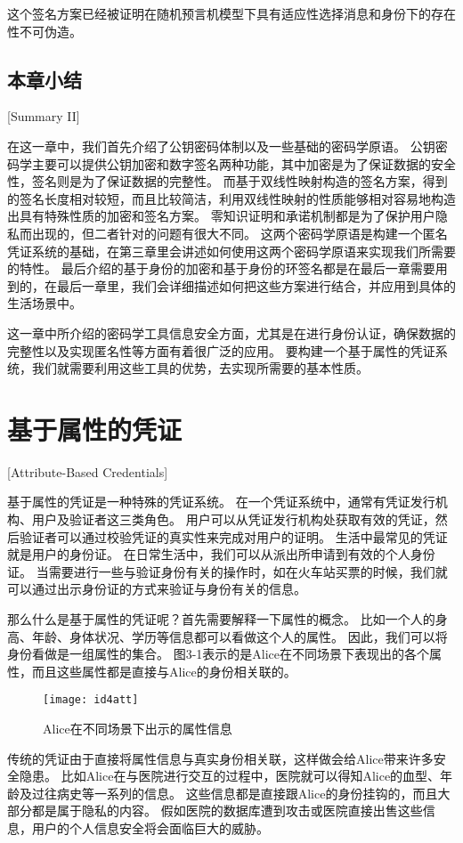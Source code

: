 这个签名方案已经被证明在随机预言机模型下具有适应性选择消息和身份下的存在性不可伪造\cite{chow2005efficient}。

\section{本章小结}[Summary II]

在这一章中，我们首先介绍了公钥密码体制以及一些基础的密码学原语。
公钥密码学主要可以提供公钥加密和数字签名两种功能，其中加密是为了保证数据的安全性，签名则是为了保证数据的完整性。
而基于双线性映射构造的签名方案，得到的签名长度相对较短，而且比较简洁，利用双线性映射的性质能够相对容易地构造出具有特殊性质的加密和签名方案。
零知识证明和承诺机制都是为了保护用户隐私而出现的，但二者针对的问题有很大不同。
这两个密码学原语是构建一个匿名凭证系统的基础，在第三章里会讲述如何使用这两个密码学原语来实现我们所需要的特性。
最后介绍的基于身份的加密和基于身份的环签名都是在最后一章需要用到的，在最后一章里，我们会详细描述如何把这些方案进行结合，并应用到具体的生活场景中。

这一章中所介绍的密码学工具信息安全方面，尤其是在进行身份认证，确保数据的完整性以及实现匿名性等方面有着很广泛的应用。
要构建一个基于属性的凭证系统，我们就需要利用这些工具的优势，去实现所需要的基本性质。

\chapter{基于属性的凭证}[Attribute-Based Credentials]

基于属性的凭证是一种特殊的凭证系统。
在一个凭证系统中，通常有凭证发行机构、用户及验证者这三类角色。
用户可以从凭证发行机构处获取有效的凭证，然后验证者可以通过校验凭证的真实性来完成对用户的证明。
生活中最常见的凭证就是用户的身份证。
在日常生活中，我们可以从派出所申请到有效的个人身份证。
当需要进行一些与验证身份有关的操作时，如在火车站买票的时候，我们就可以通过出示身份证的方式来验证与身份有关的信息。

那么什么是基于属性的凭证呢？首先需要解释一下属性的概念。
比如一个人的身高、年龄、身体状况、学历等信息都可以看做这个人的属性。
因此，我们可以将身份看做是一组属性的集合。
图3-1表示的是Alice在不同场景下表现出的各个属性，而且这些属性都是直接与Alice的身份相关联的。

\begin{figure}[h]
\centering
\texttt{[image: id4att]}
\caption{Alice在不同场景下出示的属性信息}
\end{figure}

传统的凭证由于直接将属性信息与真实身份相关联，这样做会给Alice带来许多安全隐患。
比如Alice在与医院进行交互的过程中，医院就可以得知Alice的血型、年龄及过往病史等一系列的信息。
这些信息都是直接跟Alice的身份挂钩的，而且大部分都是属于隐私的内容。
假如医院的数据库遭到攻击或医院直接出售这些信息，用户的个人信息安全将会面临巨大的威胁。

